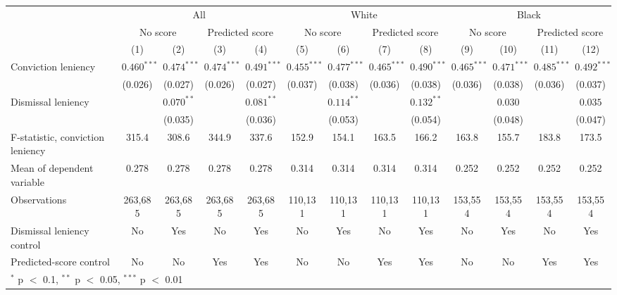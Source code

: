 \begin{tabular}{lcccccccccccc}
\toprule
 & \multicolumn{4}{c}{All} & \multicolumn{4}{c}{White} & \multicolumn{4}{c}{Black} \\
\cmidrule(lr){2-5}\cmidrule(lr){6-9}\cmidrule(lr){10-13}
 & \multicolumn{2}{c}{No score} & \multicolumn{2}{c}{Predicted score} & \multicolumn{2}{c}{No score} & \multicolumn{2}{c}{Predicted score} & \multicolumn{2}{c}{No score} & \multicolumn{2}{c}{Predicted score} \\
\cmidrule(lr){2-3}\cmidrule(lr){4-5}\cmidrule(lr){6-7}\cmidrule(lr){8-9}\cmidrule(lr){10-11}\cmidrule(lr){12-13}
 & (1) & (2) & (3) & (4) & (5) & (6) & (7) & (8) & (9) & (10) & (11) & (12) \\
\midrule
Conviction leniency & $0.460^{***}$ & $0.474^{***}$ & $0.474^{***}$ & $0.491^{***}$ & $0.455^{***}$ & $0.477^{***}$ & $0.465^{***}$ & $0.490^{***}$ & $0.465^{***}$ & $0.471^{***}$ & $0.485^{***}$ & $0.492^{***}$ \\
 & (0.026) & (0.027) & (0.026) & (0.027) & (0.037) & (0.038) & (0.036) & (0.038) & (0.036) & (0.038) & (0.036) & (0.037) \\
Dismissal leniency &  & $0.070^{**}$ &  & $0.081^{**}$ &  & $0.114^{**}$ &  & $0.132^{**}$ &  & $0.030$ &  & $0.035$ \\
 &  & (0.035) &  & (0.036) &  & (0.053) &  & (0.054) &  & (0.048) &  & (0.047) \\
\midrule
F-statistic, conviction leniency & 315.4 & 308.6 & 344.9 & 337.6 & 152.9 & 154.1 & 163.5 & 166.2 & 163.8 & 155.7 & 183.8 & 173.5 \\
Mean of dependent variable & 0.278 & 0.278 & 0.278 & 0.278 & 0.314 & 0.314 & 0.314 & 0.314 & 0.252 & 0.252 & 0.252 & 0.252 \\
Observations & 263,685 & 263,685 & 263,685 & 263,685 & 110,131 & 110,131 & 110,131 & 110,131 & 153,554 & 153,554 & 153,554 & 153,554 \\
Dismissal leniency control & No & Yes & No & Yes & No & Yes & No & Yes & No & Yes & No & Yes \\
Predicted-score control & No & No & Yes & Yes & No & No & Yes & Yes & No & No & Yes & Yes \\
\bottomrule
\multicolumn{13}{l}{\footnotesize $^{*}$ p $<$ 0.1, $^{**}$ p $<$ 0.05, $^{***}$ p $<$ 0.01} \\
\end{tabular}
